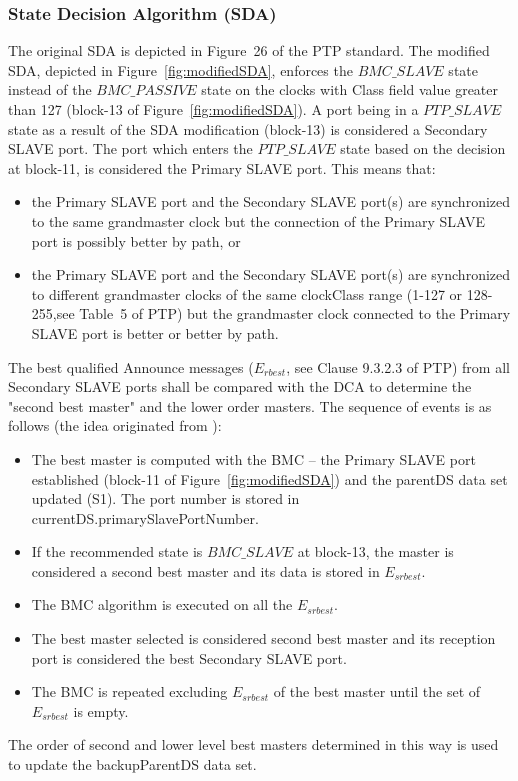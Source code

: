 \documentclass[a4paper, 12pt]{article}
\begin{document}
\subsubsection{State Decision Algorithm (SDA)}
\label{StadeDecisionAlg}

The original SDA is depicted in Figure~26 of the PTP standard. The modified SDA, depicted in
Figure~\ref{fig:modifiedSDA}, enforces the $BMC\_SLAVE$ state instead of the $BMC\_PASSIVE$ state 
on the clocks with Class field value greater than 127 (block-13 of Figure~\ref{fig:modifiedSDA}). 
A port being in a $PTP\_SLAVE$ state as a result of the SDA modification (block-13) is considered 
a Secondary SLAVE port. The port which enters 
the $PTP\_SLAVE$ state based on the decision at block-11, is considered the Primary SLAVE port.
This means that:
\begin{itemize}
  \item the Primary SLAVE port and the Secondary SLAVE port(s) are synchronized to the same 
	grandmaster clock but the connection of the Primary SLAVE port is possibly better by path, or
  \item the Primary SLAVE port and the Secondary SLAVE port(s) are synchronized to different 
	grandmaster clocks of the same clockClass range (1-127 or 128-255,see Table~5 of PTP) 
	but the grandmaster clock connected to the Primary SLAVE port is better or better by path.
\end{itemize}

The best qualified Announce messages ($E_{rbest}$, see Clause 9.3.2.3 of PTP) from all Secondary 
SLAVE ports shall be compared with the DCA to determine the "second best master" and the lower order
masters. The sequence of events is as follows (the idea originated from \cite{Takahide}):
\begin{itemize}
  \item The best master is computed with the BMC -- the Primary SLAVE port established (block-11 of
	Figure~\ref{fig:modifiedSDA}) and the parentDS data set updated (S1). The port number is 
	stored in currentDS.primarySlavePortNumber.
  \item If the recommended state is $BMC\_SLAVE$ at block-13, the master is considered
        a second best master and its data is stored in $E_{srbest}$.
  \item The BMC algorithm is executed on all the $E_{srbest}$.
  \item The best master selected is considered second best master and its reception port is 
	considered the best Secondary SLAVE port.
  \item The BMC is repeated excluding $E_{srbest}$ of the best master until the set of $E_{srbest}$ 
	is empty.
\end{itemize}
The order of second and lower level best masters determined in this way is used to update the
backupParentDS data set.
\end{document}

